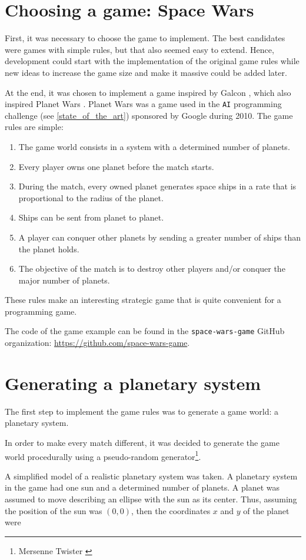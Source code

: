 \documentclass[a4paper,11pt,titlepage,abstract,numbers=noenddot,automark,mnsy,intlimits,rgb,dvipsnames]{report}
\begin{document}
\section{Choosing a game: Space Wars}
First, it was necessary to choose the game to implement. The best candidates were games with simple rules, but that
also seemed easy to extend. Hence, development could start with the implementation of the original game rules while
new ideas to increase the game size and make it massive could be added later.

At the end, it was chosen to implement a game inspired by Galcon \cite{galcon}, which also inspired
Planet Wars \cite{planet_wars}. Planet Wars was a game used in the \texttt{AI} programming challenge
(see \autoref{state_of_the_art}) sponsored by Google during 2010. The game rules are simple:
\begin{enumerate}
\item
The game world consists in a system with a determined number of planets.
\item
Every player owns one planet before the match starts.
\item
During the match, every owned planet generates space ships in a rate that is proportional to the radius of the planet.
\item
Ships can be sent from planet to planet.
\item
A player can conquer other planets by sending a greater number of ships than the planet holds.
\item
The objective of the match is to destroy other players and/or conquer the major number of planets.
\end{enumerate}
These rules make an interesting strategic game that is quite convenient for a programming game.

The code of the game example can be found in the \texttt{space-wars-game} GitHub organization: \url{https://github.com/space-wars-game}.
\section{Generating a planetary system}
The first step to implement the game rules was to generate a game world: a planetary system.

In order to make every match different, it was decided to generate the game world procedurally using a pseudo-random
generator\footnote{Mersenne Twister \cite{mersenne_twister}}.

A simplified model of a realistic planetary system was taken. A planetary system in the game had one sun and a
determined number of planets. A planet was assumed to move describing an ellipse with the sun as its center.
Thus, assuming the position of the sun was $(0, 0)$, then the coordinates $x$ and $y$ of the planet were
\end{document}
